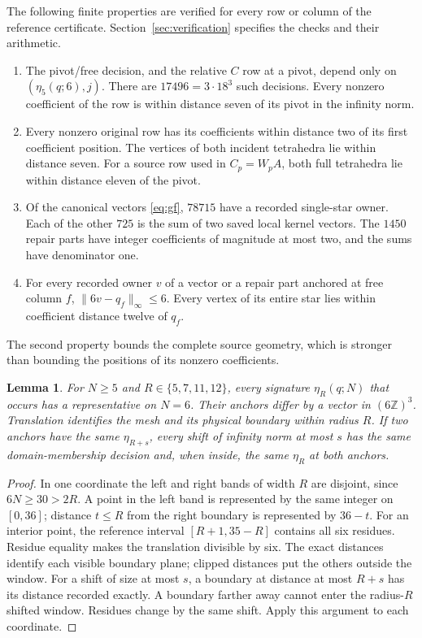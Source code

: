 \documentclass[11pt]{article}
\newtheorem{lemma}[theorem]{Lemma}
\theoremstyle{remark}
\newcommand{\Z}{\mathbb Z}
\newcommand{\norminf}[1]{\lVert#1\rVert_\infty}
\begin{document}
The following finite properties are verified for every row or column of
the reference certificate. Section~\ref{sec:verification} specifies the
checks and their arithmetic.
\begin{enumerate}
\item The pivot/free decision, and the relative $C$ row at a pivot,
depend only on $(\eta_5(q;6),j)$. There are $17496=3\cdot18^3$ such
decisions. Every nonzero coefficient of the row is within distance seven
of its pivot in the infinity norm.
\item Every nonzero original row has its coefficients within distance two
of its first coefficient position. The vertices of both incident
tetrahedra lie within distance seven. For a source row used in $C_p=W_pA$,
both full tetrahedra lie within distance eleven of the pivot.
\item Of the canonical vectors \eqref{eq:gf}, $78715$ have a recorded
single-star owner. Each of the other $725$ is the sum of two saved local
kernel vectors. The $1450$ repair parts have integer coefficients of
magnitude at most two, and the sums have denominator one.
\item For every recorded owner $v$ of a vector or a repair part anchored
at free column $f$, $\norminf{6v-q_f}\le6$. Every vertex of its entire
star lies within coefficient distance twelve of $q_f$.
\end{enumerate}
The second property bounds the complete source geometry, which is stronger
than bounding the positions of its nonzero coefficients.

\begin{lemma}\label{lem:windows}
For $N\ge5$ and $R\in\{5,7,11,12\}$, every signature $\eta_R(q;N)$
that occurs has a representative on $N=6$. Their anchors differ by a
vector in $(6\Z)^3$. Translation identifies the mesh and its physical
boundary within radius $R$. If two anchors have the same $\eta_{R+s}$,
every shift of infinity norm at most $s$ has the same domain-membership
decision and, when inside, the same $\eta_R$ at both anchors.
\end{lemma}
\begin{proof}
In one coordinate the left and right bands of width $R$ are disjoint,
since $6N\ge30>2R$. A point in the left band is represented by the same
integer on $[0,36]$; distance $t\le R$ from the right boundary is
represented by $36-t$. For an interior point, the reference interval
$[R+1,35-R]$ contains all six residues. Residue equality makes the
translation divisible by six. The exact distances identify each visible
boundary plane; clipped distances put the others outside the window.
For a shift of size at most $s$, a boundary at distance at most $R+s$
has its distance recorded exactly. A boundary farther away cannot enter
the radius-$R$ shifted window. Residues change by the same shift.
Apply this argument to each coordinate.
\end{proof}
\end{document}
